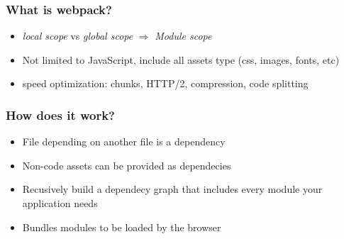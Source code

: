 \begin{frame}[fragile]
    \frametitle{What is webpack?}
    \begin{itemize}
        \item \textit{local scope} vs \textit{global scope} $\Rightarrow$ \textit{Module scope}
        \item Not limited to JavaScript, include all assets type (css, images, fonts, etc)
        \item speed optimization: chunks, HTTP/2, compression, code splitting
    \end{itemize}
\end{frame}

\begin{frame}
    \frametitle{How does it work?}
    \begin{itemize}
        \item File depending on another file is a dependency
        \item Non-code assets can be provided as dependecies
        \item Recusively build a dependecy graph that includes every module your application needs
        \item Bundles modules to be loaded by the browser
    \end{itemize}
\end{frame}